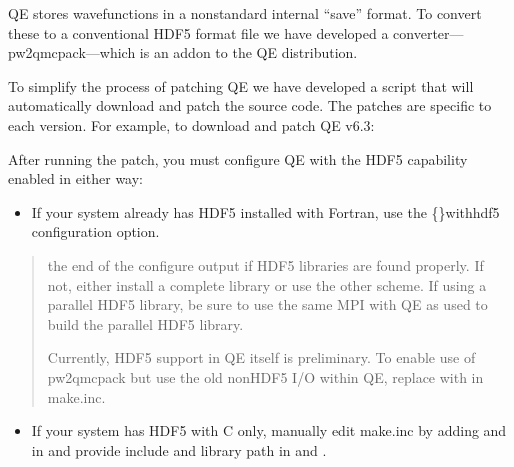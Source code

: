 \documentclass[letterpaper,10pt,english]{sphinxmanual}
\begin{document}
QE stores wavefunctions in a nonstandard internal
“save” format. To convert these to a conventional HDF5 format file
we have developed a converter—pw2qmcpack—which is an add\sphinxhyphen{}on to the
QE distribution.

To simplify the process of patching QE we have developed
a script that will automatically download and patch the source
code. The patches are specific to each version. For example, to download and
patch QE v6.3:

\begin{sphinxVerbatim}[commandchars=\\\{\}]
 
\end{sphinxVerbatim}

After running the patch, you must configure QE with
the HDF5 capability enabled in either way:
\begin{itemize}
\item {} 
If your system already has HDF5 installed with Fortran, use the \sphinxhyphen{}\{\}\sphinxhyphen{}with\sphinxhyphen{}hdf5 configuration option.

\end{itemize}
\begin{quote}

\begin{sphinxVerbatim}[commandchars=\\\{\}]
 
    
\end{sphinxVerbatim}

 the end of the configure output if HDF5 libraries are found properly.
If not, either install a complete library or use the other scheme. If using a parallel HDF5 library, be sure to use
the same MPI with QE as used to build the parallel HDF5 library.

Currently, HDF5 support in QE itself is preliminary. To enable use of pw2qmcpack
but use the old non\sphinxhyphen{}HDF5 I/O within QE, replace  with  in make.inc.
\end{quote}
\begin{itemize}
\item {} 
If your system has HDF5 with C only, manually edit make.inc by adding  and 
in  and provide include and library path in  and .

\end{itemize}
\end{document}
